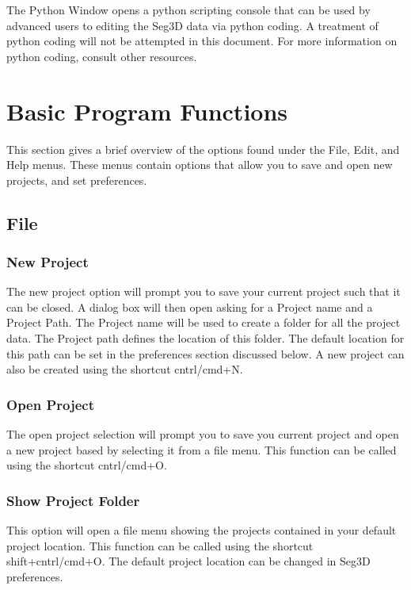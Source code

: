 \documentclass[fleqn,11pt,openany]{book}
\begin{document}
The Python Window opens a python scripting console that can be used by advanced users to editing the Seg3D data via python coding.  
A treatment of python coding will not be attempted in this document.
For more information on python coding, consult other resources.

\chapter{Basic Program Functions}

\begin{introduction}
This section gives a brief overview of the options found under the File, Edit, and Help menus. These menus contain options
that allow you to save and open new projects, and set preferences. 

\end{introduction}

\section{File}

\subsection{New Project}
The new project option will prompt you to save your current project such that it can be closed. A dialog box will then open
asking for a Project name and a Project Path.  The Project name will be used to create a folder for all the project data.  The Project path defines the location of this folder.  The default location for this path can be set in the preferences section discussed below. A new project can also be created using the shortcut cntrl/cmd+N.

\subsection{Open Project}
The open project selection will prompt you to save you current project and open a new project based by selecting it from a file menu.  This function can be called using the shortcut cntrl/cmd+O.

\subsection{Show Project Folder}
This option will open a file menu showing the projects contained in your default project location.  This function can be called using the shortcut shift+cntrl/cmd+O.  The default project location can be changed in Seg3D preferences.
\end{document}
